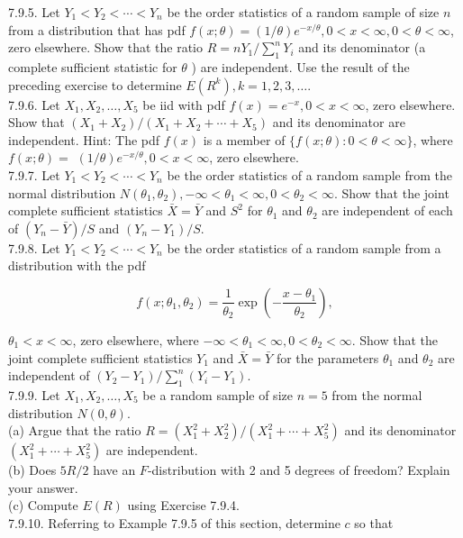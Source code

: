 7.9.5. Let $Y_{1}<Y_{2}<\cdots<Y_{n}$ be the order statistics of a random sample of size $n$ from a distribution that has pdf $f(x ; \theta)=(1 / \theta) e^{-x / \theta}, 0<x<\infty, 0<\theta<\infty$, zero elsewhere. Show that the ratio $R=n Y_{1} / \sum_{1}^{n} Y_{i}$ and its denominator (a complete sufficient statistic for $\theta$ ) are independent. Use the result of the preceding exercise to determine $E\left(R^{k}\right), k=1,2,3, \ldots$.\\
7.9.6. Let $X_{1}, X_{2}, \ldots, X_{5}$ be iid with pdf $f(x)=e^{-x}, 0<x<\infty$, zero elsewhere. Show that $\left(X_{1}+X_{2}\right) /\left(X_{1}+X_{2}+\cdots+X_{5}\right)$ and its denominator are independent. Hint: The pdf $f(x)$ is a member of $\{f(x ; \theta): 0<\theta<\infty\}$, where $f(x ; \theta)=$ $(1 / \theta) e^{-x / \theta}, 0<x<\infty$, zero elsewhere.\\
7.9.7. Let $Y_{1}<Y_{2}<\cdots<Y_{n}$ be the order statistics of a random sample from the normal distribution $N\left(\theta_{1}, \theta_{2}\right),-\infty<\theta_{1}<\infty, 0<\theta_{2}<\infty$. Show that the joint complete sufficient statistics $\bar{X}=\bar{Y}$ and $S^{2}$ for $\theta_{1}$ and $\theta_{2}$ are independent of each of $\left(Y_{n}-\bar{Y}\right) / S$ and $\left(Y_{n}-Y_{1}\right) / S$.\\
7.9.8. Let $Y_{1}<Y_{2}<\cdots<Y_{n}$ be the order statistics of a random sample from a distribution with the pdf

$$
f\left(x ; \theta_{1}, \theta_{2}\right)=\frac{1}{\theta_{2}} \exp \left(-\frac{x-\theta_{1}}{\theta_{2}}\right),
$$

$\theta_{1}<x<\infty$, zero elsewhere, where $-\infty<\theta_{1}<\infty, 0<\theta_{2}<\infty$. Show that the joint complete sufficient statistics $Y_{1}$ and $\bar{X}=\bar{Y}$ for the parameters $\theta_{1}$ and $\theta_{2}$ are independent of $\left(Y_{2}-Y_{1}\right) / \sum_{1}^{n}\left(Y_{i}-Y_{1}\right)$.\\
7.9.9. Let $X_{1}, X_{2}, \ldots, X_{5}$ be a random sample of size $n=5$ from the normal distribution $N(0, \theta)$.\\
(a) Argue that the ratio $R=\left(X_{1}^{2}+X_{2}^{2}\right) /\left(X_{1}^{2}+\cdots+X_{5}^{2}\right)$ and its denominator $\left(X_{1}^{2}+\cdots+X_{5}^{2}\right)$ are independent.\\
(b) Does $5 R / 2$ have an $F$-distribution with 2 and 5 degrees of freedom? Explain your answer.\\
(c) Compute $E(R)$ using Exercise 7.9.4.\\
7.9.10. Referring to Example 7.9.5 of this section, determine $c$ so that

